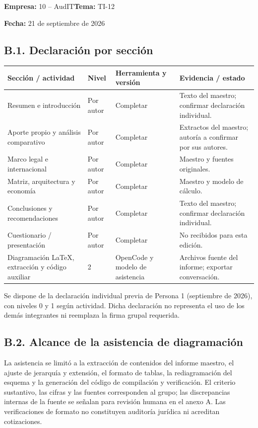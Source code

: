\textbf{Empresa:} 10 -- AudIT\hfill\textbf{Tema:} TI-12\par
\textbf{Fecha:} 21 de septiembre de 2026


\subsection{B.1. Declaración por sección}
\begin{center}\footnotesize\renewcommand{\arraystretch}{1.4}
\begin{tabularx}{\linewidth}{@{}p{4cm}p{1.8cm}XX@{}}
\toprule\textbf{Sección / actividad} & \textbf{Nivel} & \textbf{Herramienta y versión} & \textbf{Evidencia / estado}\\\midrule
Resumen e introducción & Por autor & Completar & Texto del maestro; confirmar declaración individual.\\
Aporte propio y análisis comparativo & Por autor & Completar & Extractos del maestro; autoría a confirmar por sus autores.\\
Marco legal e internacional & Por autor & Completar & Maestro y fuentes originales.\\
Matriz, arquitectura y economía & Por autor & Completar & Maestro y modelo de cálculo.\\
Conclusiones y recomendaciones & Por autor & Completar & Texto del maestro; confirmar declaración individual.\\
Cuestionario / presentación & Por autor & Completar & No recibidos para esta edición.\\
Diagramación LaTeX, extracción y código auxiliar & 2 & OpenCode y modelo de asistencia & Archivos fuente del informe; exportar conversación.\\\bottomrule
\end{tabularx}\end{center}
Se dispone de la declaración individual previa de Persona 1 (septiembre de 2026), con niveles 0 y 1 según actividad. Dicha declaración no representa el uso de los demás integrantes ni reemplaza la firma grupal requerida.

\subsection{B.2. Alcance de la asistencia de diagramación}
La asistencia se limitó a la extracción de contenidos del informe maestro, el ajuste de jerarquía y extensión, el formato de tablas, la rediagramación del esquema y la generación del código de compilación y verificación. El criterio sustantivo, las cifras y las fuentes corresponden al grupo; las discrepancias internas de la fuente se señalan para revisión humana en el anexo A. Las verificaciones de formato no constituyen auditoría jurídica ni acreditan cotizaciones.

